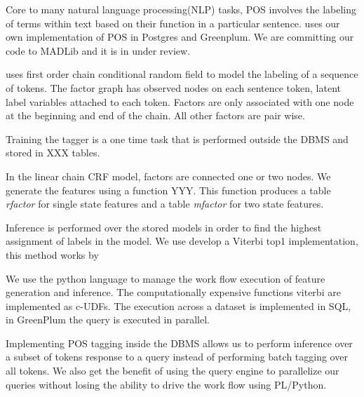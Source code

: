
Core to many natural language processing(NLP) tasks, POS involves the
labeling of terms within text based on their function in a particular sentence.
\system uses our own implementation of POS in Postgres and Greenplum. We are
committing our code to MADLib and it is in under review.

\system uses first order chain conditional random field to model the labeling
of a sequence of tokens. The factor graph has observed nodes on each sentence
token, latent label variables attached to each token.
Factors are only associated with one node at the beginning and end of the chain.
All other factors are pair wise. 

Training the tagger is a one time task that is performed outside the 
DBMS and stored in XXX tables. 

In the linear chain CRF model, factors are connected one or two nodes.  
We generate the features using a function YYY. 
This function produces a table
\textit{rfactor} for single state features and a table \textit{mfactor} for two
state features.

Inference is performed over the stored models in order to find the highest 
assignment of labels in the model.
We use develop a Viterbi top1 implementation, this method works by 

We use the python language to manage the work flow execution of feature 
generation and inference.
The computationally expensive functions viterbi are implemented as c-UDFs.
The execution across a dataset is implemented in SQL, in GreenPlum the query
is executed in parallel.


Implementing POS tagging inside the DBMS allows us to perform inference over a 
subset of tokens response to a query instead of performing batch tagging over 
all tokens.
We also get the benefit of using the query engine to parallelize our queries
without losing the ability to drive the work flow using PL/Python.






